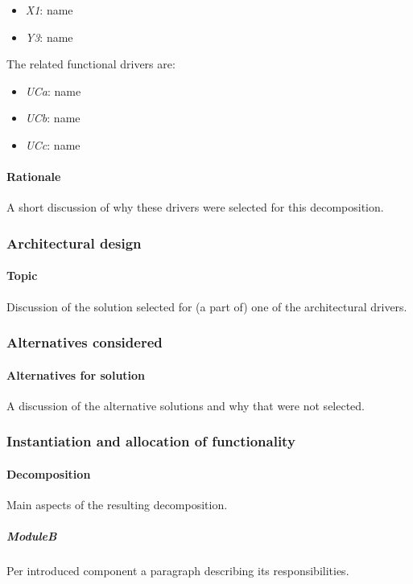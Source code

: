 \documentclass[a4paper,10pt]{article}
\begin{document}
\begin{itemize}
    \item \emph{X1}: name
    \item \emph{Y3}: name
\end{itemize}

The related functional drivers are:

\begin{itemize}
    \item \emph{UCa}: name
    \item \emph{UCb}: name
    \item \emph{UCc}: name
\end{itemize}

\paragraph{Rationale}
A short discussion of why these drivers were selected for this decomposition.

\subsubsection{Architectural design}
\paragraph{Topic}
Discussion of the solution selected for (a part of) one of the architectural
drivers.

\subsubsection*{Alternatives considered}
\paragraph{Alternatives for solution}
A discussion of the alternative solutions and why that were not selected.

\subsubsection{Instantiation and allocation of functionality}
\paragraph{Decomposition}
Main aspects of the resulting decomposition.

\subparagraph{ModuleB}
Per introduced component a paragraph describing its responsibilities.
\end{document}
